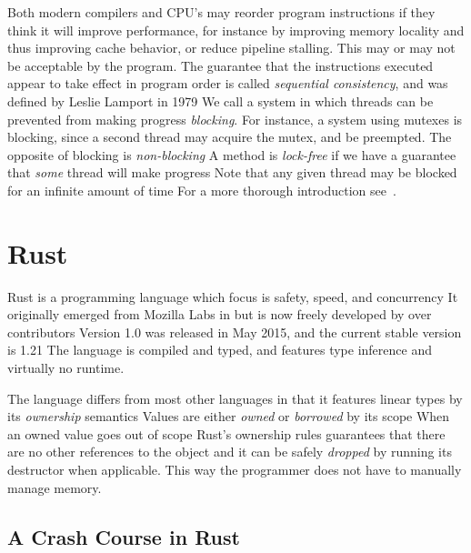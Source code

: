 \documentclass[b5paper]{report}
\begin{document}
Both modern compilers and CPU's may reorder program instructions if they think
it will improve performance, for instance by improving memory locality and thus
improving cache behavior, or reduce pipeline stalling. This may or may not be
acceptable by the program. The guarantee that the instructions executed appear
to take effect in program order is called \emph{sequential consistency}, and
was defined by Leslie Lamport in 1979 We call a system in
which threads can be prevented from making progress \emph{blocking}. For
instance, a system using mutexes is blocking, since a second thread may acquire
the mutex, and be preempted. The opposite of blocking is \emph{non-blocking} A
method is \emph{lock-free} if we have a guarantee that \emph{some} thread will
make progress Note that any given thread may be blocked for an infinite
amount of time For a more thorough introduction see~\cite{herlihy2011art}.




\section{Rust}\label{sec:rust}


 Rust is a programming language which focus is safety, speed, and
concurrency It originally emerged from Mozilla Labs in  but is now
freely developed by over  contributors Version 1.0 was released
in May 2015, and the current stable version is 1.21 The language is compiled
and typed, and features type inference and virtually no runtime.

The language differs from most other languages in that it features linear types
by its \emph{ownership} semantics Values are either \emph{owned} or
\emph{borrowed} by its scope When an owned value goes out of scope Rust's
ownership rules guarantees that there are no other references to the object and
it can be safely \emph{dropped} by running its destructor when applicable.
This way the programmer does not have to manually manage memory.

\subsection{A Crash Course in Rust}
\end{document}
